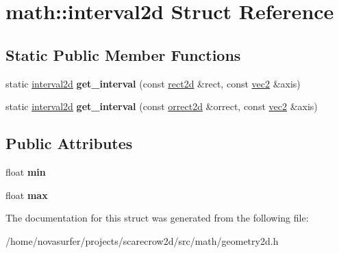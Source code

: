 \hypertarget{structmath_1_1interval2d}{}\section{math\+:\+:interval2d Struct Reference}
\label{structmath_1_1interval2d}
\subsection*{Static Public Member Functions}
\begin{DoxyCompactItemize}
\item 
\mbox{\label{structmath_1_1interval2d_a6e391e2dffbfd47c78ccd2667a24fc66}} 
static \hyperlink{structmath_1_1interval2d}{interval2d} {\bfseries get\+\_\+interval} (const \hyperlink{structmath_1_1rect2d}{rect2d} \&rect, const \hyperlink{structmath_1_1vec2}{vec2} \&axis)
\item 
\mbox{\label{structmath_1_1interval2d_a28c98b51fc765684168ac92a7f373de5}} 
static \hyperlink{structmath_1_1interval2d}{interval2d} {\bfseries get\+\_\+interval} (const \hyperlink{structmath_1_1orrect2d}{orrect2d} \&orrect, const \hyperlink{structmath_1_1vec2}{vec2} \&axis)
\end{DoxyCompactItemize}
\subsection*{Public Attributes}
\begin{DoxyCompactItemize}
\item 
\mbox{\label{structmath_1_1interval2d_ab22324d1825a2809bdeb2e7c22898e9e}} 
float {\bfseries min}
\item 
\mbox{\label{structmath_1_1interval2d_ab97494891c33376c009ececd62d1bfec}} 
float {\bfseries max}
\end{DoxyCompactItemize}


The documentation for this struct was generated from the following file\+:\begin{DoxyCompactItemize}
\item 
/home/novasurfer/projects/scarecrow2d/src/math/geometry2d.\+h\end{DoxyCompactItemize}
